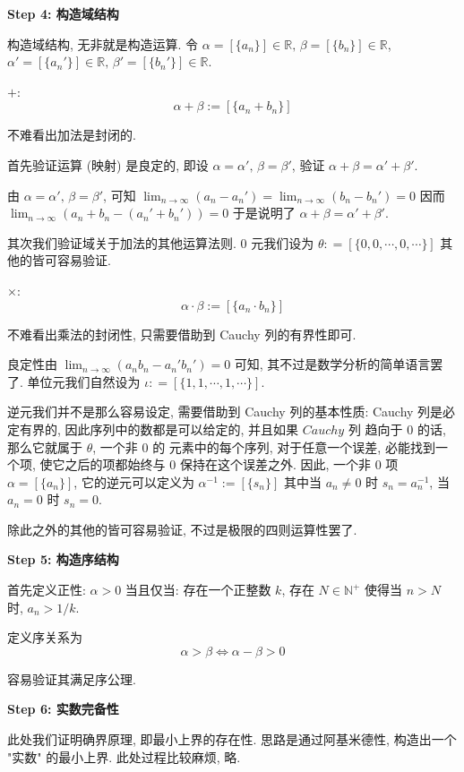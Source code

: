 \documentclass[UTF8]{book}
\begin{document}
\noindent \textbf{Step 4: 构造域结构}

构造域结构, 无非就是构造运算. 令 
$\alpha =[\{a_n\}] \in \mathbb{R},\, \beta =[\{b_n\}] \in \mathbb{R}$,
$\alpha' =[\{a_n'\}] \in \mathbb{R},\, \beta' =[\{b_n'\}] \in \mathbb{R}$.

\textbf{$+$}: $$\alpha + \beta := [\{a_n + b_n\}]$$ 

不难看出加法是封闭的. 

首先验证运算 (映射) 是良定的, 即设 
$\alpha = \alpha',\,\beta = \beta'$, 验证 $ \alpha + \beta = \alpha' + \beta'$. 

由 $\alpha = \alpha',\,\beta = \beta'$, 可知 
$\lim_{n\to\infty} (a_n - a_n') = \lim_{n\to\infty} (b_n - b_n') = 0$ 
因而 
$ \lim_{n\to\infty} (a_n + b_n - (a_n'+b_n')) = 0 $ 于是说明了 
$ \alpha + \beta = \alpha' + \beta'  $.

其次我们验证域关于加法的其他运算法则. 
0 元我们设为 $ \theta : = [\{0,0,\cdots,0,\cdots\}] $ 其他的皆可容易验证. 

\textbf{$\times$}: $$\alpha \cdot \beta := [\{a_n \cdot b_n\}]$$ 

不难看出乘法的封闭性, 只需要借助到 Cauchy 列的有界性即可. 

良定性由 $ \lim_{n\to\infty} (a_nb_n - a_n'b_n') = 0 $ 可知, 
其不过是数学分析的简单语言罢了. 
单位元我们自然设为 $\iota : = [\{1,1,\cdots,1,\cdots\}]$. 

逆元我们并不是那么容易设定, 需要借助到 Cauchy 列的基本性质: 
Cauchy 列是必定有界的, 因此序列中的数都是可以给定的, 并且如果 $Cauchy$ 列
趋向于 0 的话, 那么它就属于 $\theta$, 一个非 0 的 元素中的每个序列, 
对于任意一个误差, 必能找到一个项, 使它之后的项都始终与 0 保持在这个误差之外. 
因此, 一个非 0 项 $ \alpha =[\{a_n\}] $, 它的逆元可以定义为 
$ \alpha^{-1} :=[\{s_n\}] $ 其中当 $a_n \neq 0$ 时 $s_n = a_n^{-1}$, 
当 $a_n = 0$ 时 $s_n = 0$. 

除此之外的其他的皆可容易验证, 
不过是极限的四则运算性罢了. 

\noindent \textbf{Step 5: 构造序结构} 

首先定义正性:
$ \alpha > 0$ 当且仅当: 
存在一个正整数 $k$, 存在 $N \in \mathbb{N}^+$ 
使得当 $ n > N $ 时, $a_n > 1/k$. 

定义序关系为
$$ \alpha > \beta \Leftrightarrow \alpha - \beta > 0 $$ 

容易验证其满足序公理. 

\noindent \textbf{Step 6: 实数完备性} 

此处我们证明确界原理, 即最小上界的存在性. 
思路是通过阿基米德性, 构造出一个 "实数" 的最小上界. 
此处过程比较麻烦, 略. 
\end{document}
